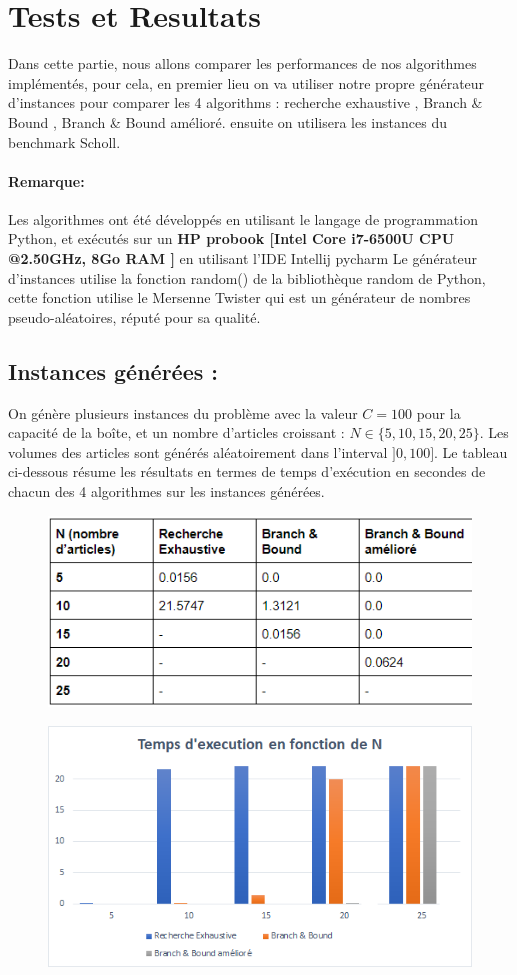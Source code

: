 \documentclass[12pt]{article}
\begin{document}
\section{Tests et Resultats}
Dans cette partie, nous allons comparer les performances de nos algorithmes implémentés, pour cela, en premier lieu on va utiliser notre propre générateur d’instances pour comparer les 4 algorithms : recherche exhaustive , Branch \& Bound , Branch \& Bound amélioré. ensuite on utilisera les instances du benchmark Scholl. 
\paragraph*{Remarque: } Les algorithmes ont été développés en utilisant le langage de programmation Python, et exécutés sur un \textbf{HP probook [Intel Core i7-6500U CPU @2.50GHz, 8Go RAM ]} en utilisant l'IDE Intellij pycharm
Le générateur d’instances utilise la fonction random() de la bibliothèque random de Python, cette fonction utilise le Mersenne Twister qui est un générateur de nombres pseudo-aléatoires, réputé pour sa qualité.
\subsection{Instances générées : }
On génère plusieurs instances du problème avec la valeur \(C=100\) pour la capacité de la boîte, et un nombre d’articles croissant : \( N \in \{5,10,15,20,25\}\). Les volumes des articles sont générés aléatoirement dans l’interval \(]0,100]\). Le tableau ci-dessous résume les résultats en termes de temps d'exécution en secondes de chacun des 4 algorithmes sur les instances générées. 
\begin{figure}[H]
    \includegraphics[width=13.5cm]{../figures/tab1.png}
\end{figure}
\begin{figure}[H]
    \includegraphics[width=13.5cm]{../figures/graph1.png}
\end{figure}
\end{document}
